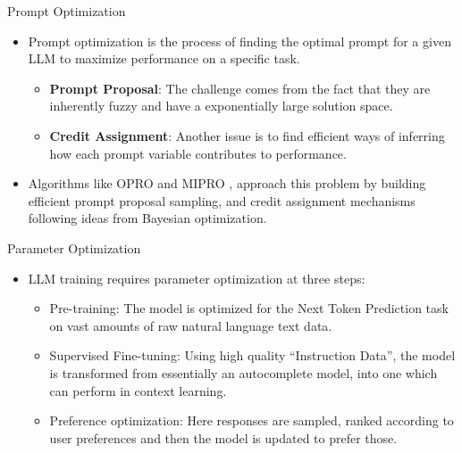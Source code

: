 \documentclass{beamer}
\begin{document}
\begin{frame}{Prompt Optimization}
    \begin{itemize}
        \item Prompt optimization is the process of finding the optimal prompt for a given LLM to maximize performance on a specific task.
        \vspace{0.5em}
        \begin{itemize}
            \item \textbf{Prompt Proposal}: The challenge comes from the fact that they are inherently fuzzy and have a exponentially large solution space.
            \vspace{0.5em}
            \item \textbf{Credit Assignment}: Another issue is to find efficient ways of inferring how each prompt variable contributes to performance.
        \end{itemize}
        \item Algorithms like OPRO \citep{yang2024largelanguagemodelsoptimizers} and MIPRO \citep{opsahlong2024optimizinginstructionsdemonstrationsmultistage}, approach this problem by building efficient prompt proposal sampling, and credit assignment mechanisms following ideas from Bayesian optimization.
    \end{itemize}
\end{frame}

\begin{frame}{Parameter Optimization}
    \begin{itemize}
        \item LLM training requires parameter optimization at three steps:
        \vspace{0.5em}
        \begin{itemize}
            \item Pre-training: The model is optimized for the Next Token Prediction task on vast amounts of raw natural language text data.
            \vspace{0.5em}
            \item Supervised Fine-tuning: Using high quality “Instruction Data”, the model is transformed from essentially an autocomplete model, into one which can perform in context learning.
            \vspace{0.5em}
            \item Preference optimization: Here responses are sampled, ranked according to user preferences and then the model is updated to prefer those.
        \end{itemize}
    \end{itemize}
\end{frame}
\end{document}
